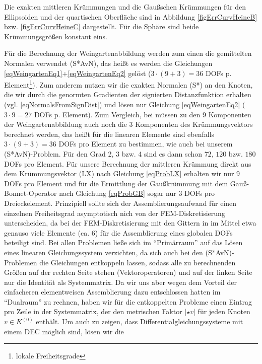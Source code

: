   Die exakten mittleren Krümmungen und die Gaußschen Krümmungen für den Ellipsoiden und der quartischen Oberfläche
  sind in Abbildung \ref{figErrCurvHeineB} bzw. \ref{figErrCurvHeineC} dargestellt.
  Für die Sphäre sind beide Krümmungsgrößen konstant eins.

  Für die Berechnung der Weingartenabbildung werden zum einen die gemittelten Normalen verwendet (S*AvN), das heißt es werden die
  Gleichungen \eqref{eqWeingartenEq1}+\eqref{eqWeingartenEq2} gelöst 
  (\( 3 \cdot (9+3) = 36 \) DOFs p. Element\footnote{lokale Freiheitsgrade}).
  Zum anderem nutzen wir die exakten Normalen (S*) an den Knoten, die wir durch die genormten Gradienten der
  signierten Distanzfunktion erhalten (vgl. \eqref{eqNormalsFromSignDist})
  und lösen nur Gleichung \eqref{eqWeingartenEq2} (\( 3 \cdot 9 = 27 \) DOFs p. Element).
  Zum Vergleich, bei \cite{heine} müssen zu den 9 Komponenten der Weingartenabbildung auch noch die 3 Komponenten des Krümmungsvektors
  berechnet werden, das heißt für die linearen Elemente sind ebenfalls \( 3 \cdot (9+3) = 36 \) DOFs pro Element zu bestimmen, wie auch bei
  unserem (S*AvN)-Problem. 
  Für den Grad 2, 3 bzw. 4 sind es dann schon \( 72 \), \( 120 \) bzw. \( 180 \) DOFs pro Element.
  Für unsere Berechnung der mittleren Krümmung direkt aus dem Krümmungsvektor (LX) nach Gleichung
  \eqref{eqProbLX} erhalten wir nur \( 9 \) DOFs pro Element
  und für die Ermittlung der Gaußkrümmung mit dem Gauß-Bonnet-Operator nach Gleichung \eqref{eqProbGB}
  sogar nur \( 3 \) DOFs pro Dreieckelement.
  Prinzipiell sollte sich der Assemblierungsaufwand für einen einzelnen Freiheitsgrad asymptotisch nich von
  der FEM-Diskretisierung unterscheiden,
  da bei der FEM-Diskretisierung mit den Gittern in \cite{heine} im Mittel etwa genauso viele Elemente 
  (ca. 6) für die Assemblierung eines globalen DOFs beteiligt sind.
  Bei allen Problemen ließe sich im "`Primärraum"' auf das Lösen eines linearen Gleichungssystem verzichten, 
  da sich auch bei den 
  (S*AvN)-Problemen die Gleichungen entkoppeln lassen, sodass alle zu berechnenden Größen auf
  der rechten Seite stehen (Vektoroperatoren) und auf der linken Seite nur die Identität als Systemmatrix.
  Da wir uns aber wegen dem Vorteil der einfacheren elementweisen Assemblierung dazu entschlossen hatten im
  "`Dualraum"' zu rechnen, haben wir für die entkoppelten Probleme einen Eintrag pro Zeile in der
  Systemmatrix, der den metrischen Faktor \( \left| \star v \right| \) für jeden Knoten \( v\in K^{(0)} \)
  enthält. 
  Um auch zu zeigen, dass Differentialgleichungssysteme mit einem DEC möglich sind, lösen wir die
